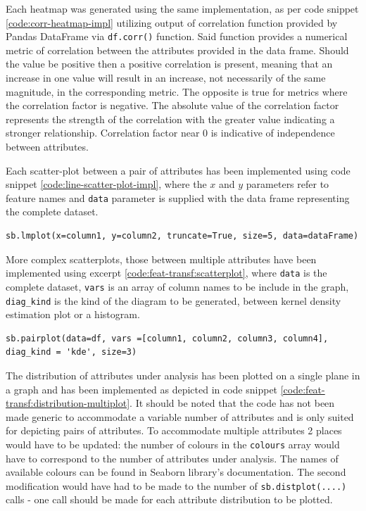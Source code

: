 Each heatmap was generated using the same implementation, as per code snippet \ref{code:corr-heatmap-impl} utilizing output of correlation function provided by Pandas DataFrame via \texttt{df.corr()} function. Said function provides a numerical metric of correlation between the attributes provided in the data frame. Should the value be positive then a positive correlation is present, meaning that an increase in one value will result in an increase, not necessarily of the same magnitude, in the corresponding metric. The opposite is true for metrics where the correlation factor is negative. The absolute value of the correlation factor represents the strength of the correlation with the greater value indicating a stronger relationship. Correlation factor near 0 is indicative of independence between attributes.

Each scatter-plot between a pair of attributes has been implemented using code snippet \ref{code:line-scatter-plot-impl}, where the $x$ and $y$ parameters refer to feature names and \texttt{data} parameter is supplied with the data frame representing the complete dataset.

\begin{code}
\label{code:line-scatter-plot-impl}
\begin{verbatim}
sb.lmplot(x=column1, y=column2, truncate=True, size=5, data=dataFrame)
\end{verbatim}
\end{code}

More complex scatterplots, those between multiple attributes have been implemented using excerpt \ref{code:feat-transf:scatterplot}, where \texttt{data} is the complete dataset, \texttt{vars} is an array of column names to be include in the graph, \texttt{diag\_kind} is the kind of the diagram to be generated, between kernel density estimation plot or a histogram.
\begin{code}
\label{code:feat-transf:scatterplot}
\begin{verbatim}
sb.pairplot(data=df, vars =[column1, column2, column3, column4], diag_kind = 'kde', size=3)
\end{verbatim}
\end{code}

The distribution of attributes under analysis has been plotted on a single plane in a graph and has been implemented as depicted in code snippet \ref{code:feat-transf:distribution-multiplot}. It should be noted that the code has not been made generic to accommodate a variable number of attributes and is only suited for depicting pairs of attributes. To accommodate multiple attributes 2 places would have to be updated: the number of colours in the \texttt{colours} array would have to correspond to the number of attributes under analysis. The names of available colours can be found in Seaborn library's documentation. The second modification would have had to be made to the number of \texttt{sb.distplot(....)} calls - one call should be made for each attribute distribution to be plotted.


